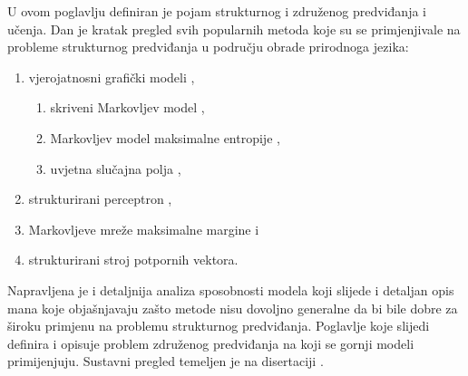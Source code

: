 U ovom poglavlju definiran je pojam strukturnog i združenog predviđanja i
učenja. Dan je kratak pregled svih popularnih metoda koje su se primjenjivale na
probleme strukturnog predviđanja u području obrade prirodnoga jezika:
\begin{enumerate}
  \item vjerojatnosni grafički modeli ,
  \begin{enumerate}
    \item skriveni Markovljev model ,
    \item Markovljev model maksimalne entropije ,
    \item uvjetna slučajna polja ,
  \end{enumerate}
  \item strukturirani perceptron ,
  \item Markovljeve mreže maksimalne margine  i
  \item strukturirani stroj potpornih vektora.
\end{enumerate}
Napravljena je i detaljnija analiza sposobnosti modela koji slijede i detaljan
opis mana koje objašnjavaju zašto metode nisu dovoljno generalne da bi bile
dobre za široku primjenu na problemu strukturnog predviđanja. Poglavlje koje
slijedi definira i opisuje problem združenog predviđanja na koji se gornji
modeli primijenjuju. Sustavni pregled temeljen je na disertaciji
\citep{daume06thesis}.
